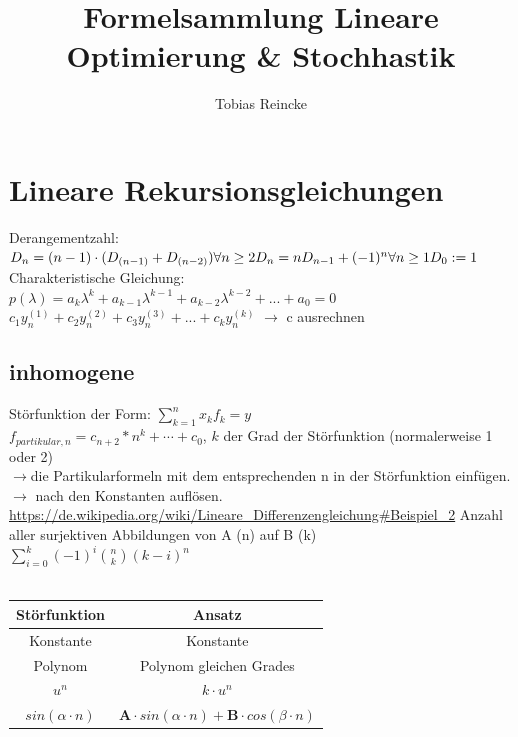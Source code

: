 \documentclass[]{article}
\title{Formelsammlung Lineare Optimierung \& Stochhastik}
\author{Tobias Reincke}
\date{}
\begin{document}
\setlength{\parindent}{0pt} 

\addtolength{\textwidth}{1.0in}
\addtolength{\textheight}{1.00in}
\addtolength{\evensidemargin}{-0.75in}
\addtolength{\oddsidemargin}{-0.75in}
\addtolength{\topmargin}{-.50in}

\newcommand{\set}[1]{$\{$#1$\}$  }

\section{Lineare Rekursionsgleichungen}
Derangementzahl: $D_n =(n-1)\cdot(D_{(n-1)}+D_{(n-2)})  \forall n \geq 2\\
D_n=nD_{n-1}+(-1)^n \forall n\geq 1\\ D_0:=1$\\
Charakteristische Gleichung: $p(\lambda)=a_k \lambda^k + a_{k-1} \lambda^{k-1} + a_{k-2} \lambda^{k-2}+ ... + a_0=0$ \\
$c_1 y_n^{ (1) }+c_2 y_n^{(2)}+c_3 y_n^{(3)}+...+c_k y_n^{(k)}$ $\rightarrow$ c ausrechnen 
\subsection{inhomogene}
Störfunktion der Form: $\sum_{k=1}^{n} x_kf_{k}=y$\\
$f_{partikular,n}= c_{n+2}*n^k+\cdots+c_{0}$, $k$ der Grad der Störfunktion (normalerweise 1 oder 2)\\
$\rightarrow$die Partikularformeln mit dem entsprechenden n in der Störfunktion einfügen.\\
$\rightarrow$ nach den Konstanten auflösen.\\
\url{https://de.wikipedia.org/wiki/Lineare_Differenzengleichung#Beispiel_2}
Anzahl aller surjektiven Abbildungen von A (n) auf B (k) \\ \centering
$\sum_{i=0}^{k} (-1)^i  \binom{n}{k} (k-i)^n$\\ \ \\
\begin{tabular}{|c|c|}
	\hline 
	Störfunktion & Ansatz \\
	\hline
	Konstante & Konstante \\
	Polynom & Polynom gleichen Grades \\
	$u^n  $& $k \cdot u^n $ \\
$	sin(\alpha \cdot n) $& $\mathbf{A} \cdot sin(\alpha \cdot n )+\mathbf{B} \cdot cos(\beta \cdot n ) $\\ \hline 
\end{tabular}
\end{document}
